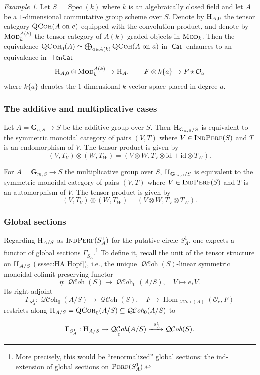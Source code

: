 \documentclass[12pt, oneside]{amsart}
\numberwithin{equation}{section}
\theoremstyle{remark}
\newtheorem{example}[subsubsection]{Example}
\theoremstyle{plain}
\newcommand{\Cat}{\operatorname{\mathsf{Cat}}}
\newcommand{\TenCat}{\operatorname{\mathsf{TenCat}}}
\newcommand{\CCC}{\TenCat}
\newcommand{\Mod}{\textsc{Mod}}
\newcommand{\grMod}{\textsc{Mod}}
\DeclareMathOperator{\QCoh}{\textsc{QCoh}}
\DeclareMathOperator{\QCOH}{\mathcal{QC}\textit{oh}}
\DeclareMathOperator{\Perf}{\textsc{Perf}}
\DeclareMathOperator{\IndPerf}{\textsc{IndPerf}}
\newcommand{\Hcat}{\textup{\textsc{H}}}
\newcommand{\HA}{\Hcat_A}
\newcommand{\HAS}{\Hcat_{A/S}}
\DeclareMathOperator{\Hom}{Hom}
\newcommand{\OO}{\mathcal{O}}
\DeclareMathOperator{\spc}{Spec}
\newcommand{\GGaS}{\mathbf{G}_{a,S}}
\newcommand{\GGmS}{\mathbf{G}_{m,S}}
\newcommand{\id}{\mathrm{id}}
\begin{document}
\begin{example}
  Let $S=\spc(k)$ where $k$ is an algebraically closed field and let $A$ be a $1$-dimensional commutative group scheme over $S$.
  Denote by $\Hcat_{A,0}$ the tensor category $\QCoh(A~\mathrm{on}~e)$ equipped with the convolution product, and denote by $\grMod^{A(k)}_{k}$ the tensor category of $A(k)$-graded objects in $\Mod_k$.
  Then the equivalence $\QCoh_0(A) \simeq \bigoplus_{a\in A(k)} \QCoh(A~\mathrm{on}~a)$ in $\Cat$ enhances to an equivalence in $\CCC$
  $$\Hcat_{A,0} \otimes \grMod^{A(k)}_{k} \to \HA, \qquad F \otimes k\{a\} \mapsto F \star \OO_a$$
  where $k\{a\}$ denotes the $1$-dimensional $k$-vector space placed in degree $a$.
\end{example}

\subsubsection{The additive and multiplicative cases}

Let $A=\GGaS \to S$ be the additive group over $S$. Then $\Hcat_{\GGaS/S}$ is equivalent to the symmetric monoidal category of pairs $(V, T)$ where $V \in \IndPerf(S)$ and $T$ is an endomorphism of $V$. The tensor product is given by $$(V,T_V) \otimes (W,T_W) = (V\otimes W, T_V \otimes \id + \id \otimes T_W).$$

For $A=\GGmS \to S$ the multiplicative group over $S$, $\Hcat_{\GGmS/S}$ is equivalent to the symmetric monoidal category of pairs $(V, T)$ where $V \in \IndPerf(S)$ and $T$ is an automorphism of $V$. The tensor product is given by $$(V,T_V) \otimes (W,T_W) = (V\otimes W, T_V \otimes T_W).$$

\subsubsection{Global sections}

Regarding $\HAS$ as $\IndPerf(S^1_A)$ for the putative circle $S^1_A$, one expects a functor of global sections $\Gamma_{S^1_A}$.\footnote{%
  More precisely, this would be ``renormalized'' global sections: the ind-extension of global sections on $\Perf(S^1_A)$.
}
To define it, recall the unit of the tensor structure on $\HAS$ (\ref{sssec:HA Hopf}), i.e., the unique $\QCOH(S)$-linear symmetric monoidal colimit-preserving functor $$\eta:\QCOH(S)\rightarrow\QCOH_{0}(A/S), \quad V \mapsto e_*V.$$ Its right adjoint
$$\Gamma_{S^1_A} : \QCOH_{0}(A/S) \rightarrow \QCOH(S), \quad F \mapsto \Hom_{\QCOH(A)}(\OO_{e}, F)$$
restricts along $\HAS = \QCoh_0(A/S) \subseteq \QCOH_0(A/S)$ to
$$\Gamma_{S^1_A} : \HAS\rightarrow\QCOH_{0}(A/S)\xrightarrow{\Gamma_{S^1_A}}\QCOH(S).$$
\end{document}
